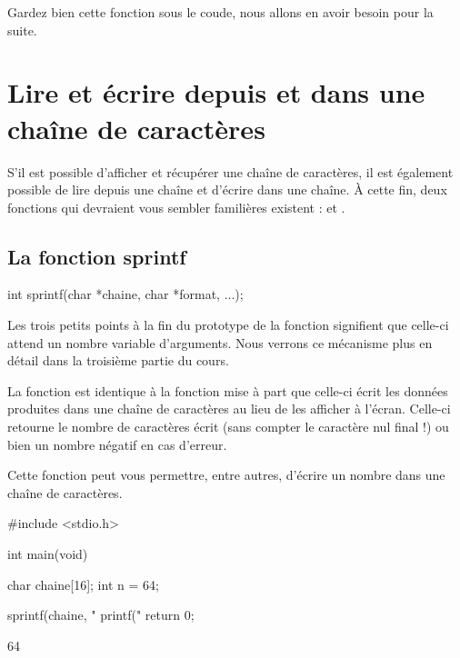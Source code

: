\begin{infobox}
  Gardez bien cette fonction sous le
coude, nous allons en avoir besoin pour la suite.
\end{infobox}

\section{Lire et écrire depuis et dans une chaîne de caractères}
\label{lire-et-ecrire-depuis-et-dans-une-chaine-de-caractères}

S'il est possible d'afficher et récupérer une chaîne
de caractères, il est également possible de lire depuis une chaîne et
d'écrire dans une chaîne. À cette fin, deux fonctions qui devraient vous
sembler familières existent :  et .

\subsection{La fonction sprintf}
\label{la-fonction-sprintf}

\begin{C}
int sprintf(char *chaine, char *format, ...);
\end{C}

\begin{infobox}
  Les trois petits points à la fin du
prototype de la fonction signifient que celle-ci attend un nombre
variable d'arguments. Nous verrons ce mécanisme plus en détail dans la
troisième partie du cours.
\end{infobox}


La fonction  est identique à la fonction
 mise à part que celle-ci écrit les données produites
dans une chaîne de caractères au lieu de les afficher à l'écran.
Celle-ci retourne le nombre de caractères écrit (sans compter le
caractère nul final !) ou bien un nombre négatif en cas d'erreur.

Cette fonction peut vous permettre, entre autres, d'écrire un nombre
dans une chaîne de caractères.

\begin{C}
#include <stdio.h>

int main(void)
{
    char chaine[16];
    int n = 64;

    sprintf(chaine, "%
    printf("%
    return 0;
}

\end{C}

\begin{C}
64
\end{C}

